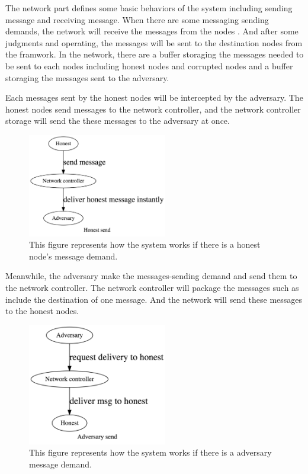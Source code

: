 \documentclass{llncs}
\begin{document}
The network part defines some basic behaviors of the system including sending message and receiving message. When there are some messaging sending demands, the network will receive the messages from the nodes . And after some judgments and operating, the messages will be sent to the destination nodes from the framwork. 
In the network, there are a buffer storaging the messages needed to be sent to each nodes including honest nodes and corrupted nodes and a buffer storaging the messages sent to the adversary. 

Each messages sent by the honest nodes will be intercepted by the adversary. The honest nodes send messages to the network controller, and the network controller storage will send the these messages to the adversary at once.

\vspace{-4mm}
\begin{figure}
	\centering
	\includegraphics[width=2.4in]{Figures/Honest send.jpg}
	\vspace{-3mm}
	\caption{This figure represents how the system works if there is a honest node's message demand.}
\end{figure}

Meanwhile, the adversary make the messages-sending demand  and send them to the network controller. The network controller will package the messages such as include the destination of one message. And the network will send these messages to the honest nodes.

\vspace{-4mm}
\begin{figure}
	\centering
	\includegraphics[width=2.4in]{Figures/Adversary send.jpg}
	\vspace{-3mm}
	\caption{This figure represents how the system works if there is a adversary message demand.}
\end{figure}
\end{document}
